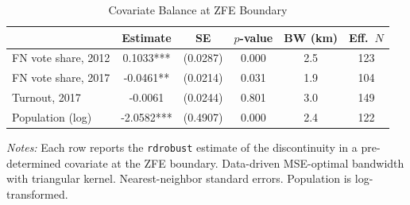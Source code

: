 \begin{table}[H]
\centering
\caption{Covariate Balance at ZFE Boundary}
\label{tab:balance}
\begin{threeparttable}
\begin{tabular}{lccccc}
\toprule
 & Estimate & SE & $p$-value & BW (km) & Eff.~$N$ \\
\midrule
  FN vote share, 2012 & 0.1033*** & (0.0287) & 0.000 & 2.5 & 123 \\
  FN vote share, 2017 & -0.0461** & (0.0214) & 0.031 & 1.9 & 104 \\
  Turnout, 2017 & -0.0061 & (0.0244) & 0.801 & 3.0 & 149 \\
  Population (log) & -2.0582*** & (0.4907) & 0.000 & 2.4 & 122 \\
\bottomrule
\end{tabular}
\begin{tablenotes}[flushleft]
\small
\item \textit{Notes:} Each row reports the \texttt{rdrobust} estimate of the discontinuity in a pre-determined covariate at the ZFE boundary. Data-driven MSE-optimal bandwidth with triangular kernel. Nearest-neighbor standard errors. Population is log-transformed.
\end{tablenotes}
\end{threeparttable}
\end{table}
